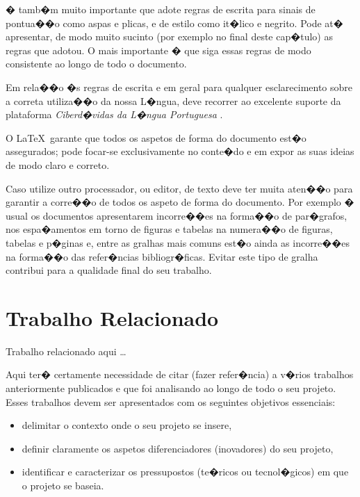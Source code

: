 � tamb�m muito importante que adote regras de escrita para sinais de pontua��o como aspas e plicas, e de estilo como it�lico e negrito. Pode at� apresentar, de modo muito sucinto (por exemplo no final deste cap�tulo) as regras que adotou. O mais importante � que siga essas regras de modo consistente ao longo de todo o documento.

Em rela��o �s regras de escrita e em geral para qualquer esclarecimento sobre a correta utiliza��o da nossa L�ngua, deve recorrer ao excelente suporte da plataforma \textit{Ciberd�vidas da L�ngua Portuguesa} \cite{ciberduvidas}.

O \LaTeX\ garante que todos os aspetos de forma do documento est�o assegurados; pode focar-se exclusivamente no conte�do e em expor as suas ideias de modo claro e correto.

Caso utilize outro processador, ou editor, de texto deve ter muita aten��o para garantir a corre��o de todos os aspeto de forma do documento. Por exemplo � usual os documentos apresentarem incorre��es na forma��o de par�grafos, nos espa�amentos em torno de figuras e tabelas na numera��o de figuras, tabelas e p�ginas e, entre as gralhas mais comuns est�o ainda as incorre��es na forma��o das refer�ncias bibliogr�ficas. Evitar este tipo de gralha contribui para a qualidade final do seu trabalho.







\chapter{Trabalho Relacionado}
\label{ch:trabalhoRelacionado}

Trabalho relacionado aqui \ldots

Aqui ter� certamente necessidade de citar (fazer refer�ncia) a v�rios trabalhos anteriormente publicados e que foi analisando ao longo de todo o seu projeto. Esses trabalhos devem ser apresentados com os seguintes objetivos essenciais:
\begin{itemize}
\item
delimitar o contexto onde o seu projeto se insere,

\item
definir claramente os aspetos diferenciadores (inovadores) do seu projeto,

\item
identificar e caracterizar os pressupostos (te�ricos ou tecnol�gicos) em que o projeto se baseia.
\end{itemize}

